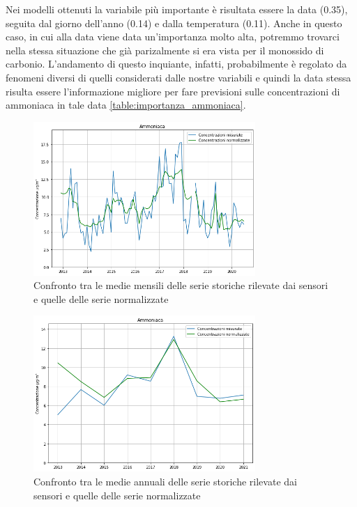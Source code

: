 \documentclass[a4paper]{report}
\begin{document}
Nei modelli ottenuti la variabile più importante è risultata essere la data (0.35), seguita dal giorno dell'anno (0.14) e dalla temperatura (0.11). Anche in questo caso, in cui alla data viene data un'importanza molto alta, potremmo trovarci nella stessa situazione che già parizalmente si era vista per il monossido di carbonio. L'andamento di questo inquiante, infatti, probabilmente è regolato da fenomeni diversi di quelli considerati dalle nostre variabili e quindi la data stessa risulta essere l'informazione migliore per fare previsioni sulle concentrazioni di ammoniaca in tale data \ref{table:importanza_ammoniaca}.

\begin{figure}[h]
\centering
\includegraphics[width=0.75\textwidth]{ammoniaca_medie_mensili}
\caption{Confronto tra le medie mensili delle serie storiche rilevate dai sensori e quelle delle serie normalizzate}
\label{fig:ammoniaca_medie_mensili}
\end{figure}

\begin{figure}[h]
\centering
\includegraphics[width=0.75\textwidth]{ammoniaca_medie_annuali}
\caption{Confronto tra le medie annuali delle serie storiche rilevate dai sensori e quelle delle serie normalizzate}
\label{fig:ammoniaca_medie_annuali}
\end{figure}
\end{document}
